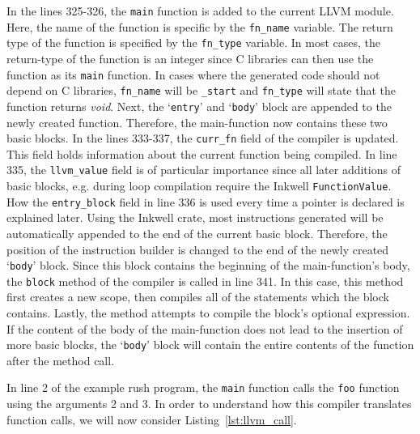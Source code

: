 In the lines 325-326, the \texttt{main} function is added to the current LLVM module.
Here, the name of the function is specific by the \texttt{fn\_name} variable.
The return type of the function is specified by the \texttt{fn\_type} variable.
In most cases, the return-type of the function is an integer since C libraries can then use the function as its \texttt{main} function.
In cases where the generated code should not depend on C libraries, \Verb|fn_name| will be \Verb|_start| and \Verb|fn_type| will state that the function returns \emph{void}.
Next, the `\texttt{entry}' and `\texttt{body}' block are appended to the newly created function.
Therefore, the main-function now contains these two basic blocks.
In the lines 333-337, the \Verb|curr_fn| field of the compiler is updated.
This field holds information about the current function being compiled.
In line 335, the \Verb|llvm_value| field is of particular importance since all later additions of basic blocks, e.g. during loop compilation require the Inkwell \texttt{FunctionValue}.
How the \Verb|entry_block| field in line 336 is used every time a pointer is declared is explained later.
Using the Inkwell crate, most instructions generated will be automatically appended to the end of the current basic block.
Therefore, the position of the instruction builder is changed to the end of the newly created `\texttt{body}' block.
Since this block contains the beginning of the main-function's body, the \texttt{block} method of the compiler is called in line 341.
In this case, this method first creates a new scope, then compiles all of the statements which the block contains.
Lastly, the method attempts to compile the block's optional expression.
If the content of the body of the main-function does not lead to the insertion of more basic blocks,
the `\texttt{body}' block will contain the entire contents of the function after the method call.

In line 2 of the example rush program, the \texttt{main} function calls the \texttt{foo} function using the arguments 2 and 3.
In order to understand how this compiler translates function calls, we will now consider Listing~\ref{lst:llvm_call}.


